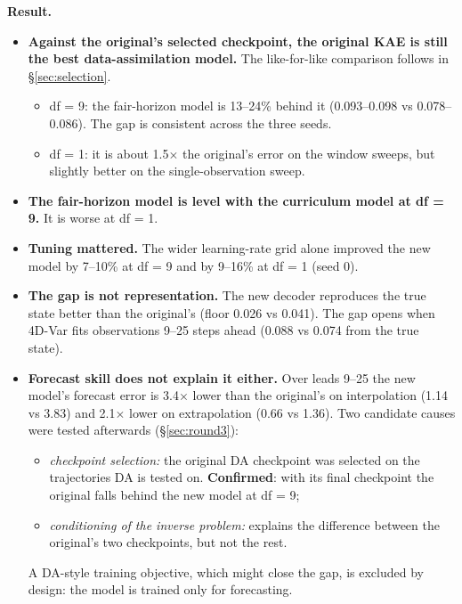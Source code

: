 \textbf{Result.}
\begin{itemize}
\item \textbf{Against the original's selected checkpoint, the original KAE is still the best
  data-assimilation model.} The like-for-like comparison follows in \S\ref{sec:selection}.
  \begin{itemize}
  \item df = 9: the fair-horizon model is 13--24\% behind it (0.093--0.098 vs
    0.078--0.086). The gap is consistent across the three seeds.
  \item df = 1: it is about 1.5$\times$ the original's error on the window sweeps, but slightly
    better on the single-observation sweep.
  \end{itemize}
\item \textbf{The fair-horizon model is level with the curriculum model at df = 9.} It is
  worse at df = 1.
\item \textbf{Tuning mattered.} The wider learning-rate grid alone improved the new model
  by 7--10\% at df = 9 and by 9--16\% at df = 1 (seed 0).
\item \textbf{The gap is not representation.} The new decoder reproduces the true state
  better than the original's (floor 0.026 vs 0.041). The gap opens when 4D-Var fits
  observations 9--25 steps ahead (0.088 vs 0.074 from the true state).
\item \textbf{Forecast skill does not explain it either.} Over leads 9--25 the new model's
  forecast error is 3.4$\times$ lower than the original's on interpolation (1.14 vs 3.83) and
  2.1$\times$ lower on extrapolation (0.66 vs 1.36). Two candidate causes were tested afterwards (\S\ref{sec:round3}):
  \begin{itemize}
  \item \emph{checkpoint selection:} the original DA checkpoint was selected on the
    trajectories DA is tested on. \textbf{Confirmed}: with its final checkpoint the original
    falls behind the new model at df = 9;
  \item \emph{conditioning of the inverse problem:} explains the difference between the
    original's two checkpoints, but not the rest.
  \end{itemize}
  A DA-style training objective, which might close the gap, is excluded by design: the model
  is trained only for forecasting.
\end{itemize}
